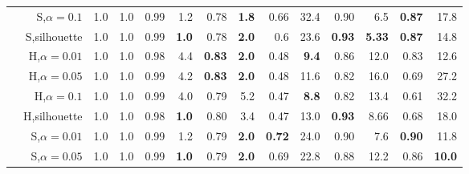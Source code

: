 \begin{table*}
\begin{center}
{\begin{tabular}[th]{@{}lrrrrrrrrrrrrr@{}}
                                                                                    & S,$\alpha=0.1$    & 1.0  & 1.0        & 0.99 & 1.2                 & 0.78 & \textbf{1.8}          & 0.66 & 32.4                & 0.90 & 6.5               & \textbf{0.87} & 17.8  \\

                                                                                    & S,silhouette      & 1.0  & 1.0        & 0.99 & \textbf{1.0}        & 0.78 & \textbf{2.0}          & 0.6 & 23.6                 & \textbf{0.93} & \textbf{5.33}       & \textbf{0.87} & 14.8 \\

                                                                                    & H,$\alpha=0.01$   & 1.0  & 1.0        & 0.98 & 4.4                 & \textbf{0.83} & \textbf{2.0} & 0.48 & \textbf{9.4}        & 0.86 & 12.0       & 0.83 & 12.6  \\

                                                                                    & H,$\alpha=0.05$   & 1.0  & 1.0        & 0.99 & 4.2                 & \textbf{0.83} & \textbf{2.0} & 0.48 & 11.6                & 0.82 & 16.0       & 0.69 & 27.2 \\

                                                                                    & H,$\alpha=0.1$    & 1.0  & 1.0        & 0.99 & 4.0                 & 0.79 & 5.2                   & 0.47 & \textbf{8.8}        & 0.82 & 13.4       & 0.61 & 32.2 \\

                                                                                    & H,silhouette      & 1.0  & 1.0        & 0.98 & \textbf{1.0}        & 0.80 & 3.4                   & 0.47 & 13.0                & \textbf{0.93} & 8.66       & 0.68 & 18.0 \\
                \midrule
   \parbox[t]{2mm}{} & S,$\alpha=0.01$   & 1.0  & 1.0        & 0.99 & 1.2                 & 0.79 & \textbf{2.0}          & \textbf{0.72} & 24.0       & 0.90 & 7.6        & \textbf{0.90} & 11.8 \\

                                                                                    & S,$\alpha=0.05$   & 1.0  & 1.0        & 0.99 & \textbf{1.0}        & 0.79 & \textbf{2.0}          & 0.69 & 22.8                & 0.88 & 12.2       & 0.86 & \textbf{10.0} \\


\end{tabular}}
\end{center}
\end{table*}

